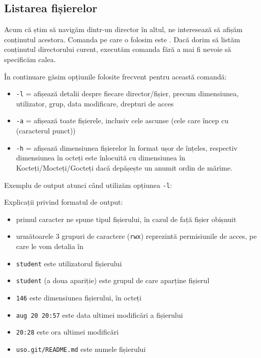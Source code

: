 \subsection{Listarea fișierelor}
\label{sec:file-system-file-list}

Acum că știm să navigăm dintr-un director în altul, ne interesează să afișăm
conținutul acestora. Comanda pe care o folosim este . Dacă dorim să listăm conținutul directorului curent, executăm comanda
 fără a mai fi nevoie să specificăm calea.

În continuare găsim opțiunile folosite frecvent pentru această comandă:

\begin{itemize}
	\item \texttt{-l} = afișează detalii despre fiecare director/fișier,
		precum dimensiunea, utilizator, grup, data modificare, drepturi
		de acces
	\item \texttt{-a} = afișează toate fișierele, inclusiv cele ascunse (cele
          care încep cu  (caracterul punct))
	\item \texttt{-h} = afișează dimensiunea fișierelor în format
		ușor de înțeles, respectiv dimensiunea în octeți este înlocuită
		cu dimensiunea în Kocteți/Mocteți/Gocteți dacă depășește un
		anumit ordin de mărime.
\end{itemize}

Exemplu de output atunci când utilizăm opțiunea \texttt{-l}:


Explicații privind formatul de output:

\begin{itemize}
	\item primul caracter ne spune tipul fișierului, în cazul de față fișier obișnuit
	\item următoarele 3 grupuri de caractere (\texttt{rwx}) reprezintă permisiunile de acces, pe care le vom detalia în 
	\item \texttt{student} este utilizatorul fișierului
        \item \texttt{student} (a doua apariție) este grupul de care aparține fișierul
	\item \texttt{146} este dimensiunea fișierului, în octeți
	\item \texttt{aug 20 20:57} este data ultimei modificări a fișierului
	\item \texttt{20:28} este ora ultimei modificări
	\item \texttt{uso.git/README.md} este numele fișierului
\end{itemize}

